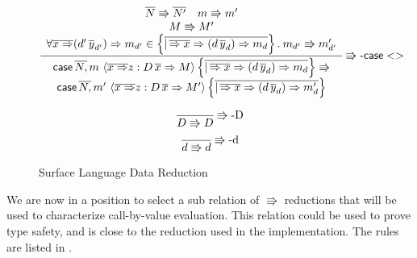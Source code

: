 \begin{figure}
\[
\frac{\begin{array}{c}
\overline{N}\Rrightarrow\overline{N'}\quad m\Rrightarrow m'\\
M\Rrightarrow M'\\
\forall\overline{x\Rightarrow}(d'\,\overline{y}_{d'})\Rightarrow m_{d'}\in\left\{ \overline{|\,\overline{\Rightarrow x}\Rightarrow(d\,\overline{y}_{d})\Rightarrow m_{d}}\right\} .\:m_{d'}\Rrightarrow m'_{d'}
\end{array}}{\begin{array}{c}
\mathsf{case}\,\overline{N,}\,m\,\left\langle \overline{x\Rightarrow}z:D\,\overline{x}\Rightarrow M\right\rangle \left\{ \overline{|\,\overline{\Rightarrow x}\Rightarrow(d\,\overline{y}_{d})\Rightarrow m_{d}}\right\} \Rrightarrow\\
\mathsf{case}\,\overline{N,}\,m'\,\left\langle \overline{x\Rightarrow}z:D\,\overline{x}\Rightarrow M'\right\rangle \left\{ \overline{|\,\overline{\Rightarrow x}\Rightarrow(d\,\overline{y}_{d})\Rightarrow m'_{d}}\right\} 
\end{array}
}\operatorname{\Rrightarrow-\mathsf{case}{}<>} 
\]

\[
\frac{\,}{D\Rrightarrow D}\operatorname{\Rrightarrow-D}
\]
\[
\frac{\,}{d\Rrightarrow d}\operatorname{\Rrightarrow-d}
\]
\caption{Surface Language Data Reduction}
\label{fig:surface-data-red}
\end{figure}

We are now in a position to select a sub relation of $\Rrightarrow$ reductions that will be used to characterize call-by-value evaluation.
This relation could be used to prove type safety, and is close to the reduction used in the implementation.
The rules are listed in .

